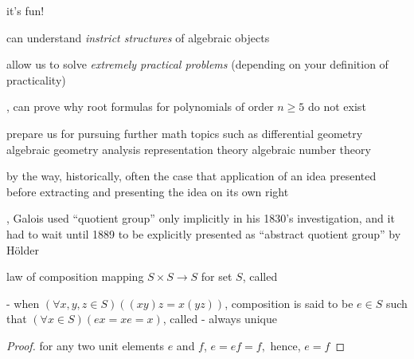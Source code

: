 \documentclass[17pt,landscape]{foils}
\begin{document}
{

%

\bit
\item
	it's fun!

\vvitem
	can understand \emph{instrict structures} of algebraic objects

\vitem
	allow us to solve \emph{extremely practical problems}
	(depending on your definition of practicality)
	\bit
	\item
		\eg, can prove why root formulas for polynomials of order $n\geq 5$ do not exist
	\eit

\vitem
	prepare us for pursuing further math topics such as
	\bit
	\vitem
		differential geometry
	\vitem
		algebraic geometry
	\vitem
		analysis
	\vitem
		representation theory
	\vitem
		algebraic number theory
	\eit
%
\eit
\vfill


%

\bit
\item
	by the way, historically, often the case that application of an idea presented
	before extracting and presenting the idea on its own right

\vitem
	\eg,
	Galois used ``quotient group'' only implicitly in his 1830's investigation,
	and it had to wait until 1889 to be explicitly presented as ``abstract quotient group''
	by H\"{o}lder
\eit
\vfill




\begin{mydefinition}{law of composition}
	mapping $S\times S \to S$ for set $S$,
	called %
	\ibit
	\item [-]
		when $(\forall x, y, z \in S)((xy)z = x(yz))$,
		composition is said to be %
	\vitem [-]
		$e\in S$ such that $(\forall x\in S)(ex = xe = x)$,
		called  - always unique

		\begin{proof}
			for any two unit elements $e$ and $f$,
			$
				e = ef = f,
			$
			hence, $e=f$
		\end{proof}
	\eit
\end{mydefinition}

}
\end{document}
